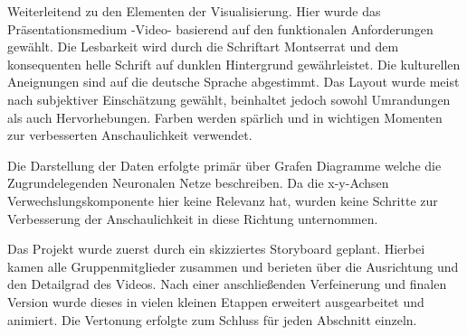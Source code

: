 Weiterleitend zu den Elementen der Visualisierung. Hier wurde das Präsentationsmedium -Video- basierend auf den funktionalen Anforderungen gewählt. Die Lesbarkeit wird durch die Schriftart Montserrat und dem konsequenten helle Schrift auf dunklen Hintergrund gewährleistet. Die kulturellen Aneignungen sind auf die deutsche Sprache abgestimmt. Das Layout wurde meist nach subjektiver Einschätzung gewählt, beinhaltet jedoch sowohl Umrandungen als auch Hervorhebungen. Farben werden spärlich und in wichtigen Momenten zur verbesserten Anschaulichkeit verwendet. 

Die Darstellung der Daten erfolgte primär über Grafen Diagramme welche die Zugrundelegenden Neuronalen Netze beschreiben. Da die x-y-Achsen Verwechslungskomponente hier keine Relevanz hat, wurden keine Schritte zur Verbesserung der Anschaulichkeit in diese Richtung unternommen. 

Das Projekt wurde zuerst durch ein skizziertes Storyboard geplant. Hierbei kamen alle Gruppenmitglieder zusammen und berieten über die Ausrichtung und den Detailgrad des Videos. Nach einer anschließenden Verfeinerung und finalen Version wurde dieses in vielen kleinen Etappen erweitert ausgearbeitet und animiert. Die Vertonung erfolgte zum Schluss für jeden Abschnitt einzeln. 

 